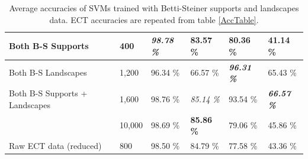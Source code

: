 \documentclass[a4paper]{article}
\begin{document}
\begin{table}[]
\begin{tabular}{l|l|l|l|l|l|}
		\multicolumn{1}{|l|}{Both B-S Supports}              & 400                                                         & \textit{\textbf{98.78 \%}} & 83.57 \%          & 80.36 \%                                                          & 41.14 \%                                                          \\ \hline
		\multicolumn{1}{|l|}{Both B-S Landscapes}            & 1,200                                                       & 96.34 \%                   & 66.57  \%         & \textit{\textbf{96.31 \%}}                                        & 65.43 \%                                                          \\ \hline
		\multicolumn{1}{|l|}{Both B-S Supports + Landscapes} & 1,600                                                       & 98.76 \%                   & \textit{85.14 \%} & 93.54 \%                                                          & \textit{\textbf{66.57 \%}}                                        \\ \hhline{|=|=|=|=|=|=|}
		\multicolumn{1}{|l|}{Raw ECT data}                   & 10,000                                                      & 98.69 \%                   & \textbf{85.86 \%} & 79.06 \%                                                          & 45.86 \%                                                          \\ \hline
		\multicolumn{1}{|l|}{Raw ECT data (reduced)}         & 800                                                         & 98.50 \%                   & 84.79 \%          & 77.58 \%                                                          & 43.36 \%                                                          \\ \hline
	\end{tabular}
	\caption{Average accuracies of SVMs trained with Betti-Steiner supports and landscapes data. ECT accuracies are repeated from table \ref{AccTable}.}
	\label{AccBetti}
\end{table}



	
\end{document}
